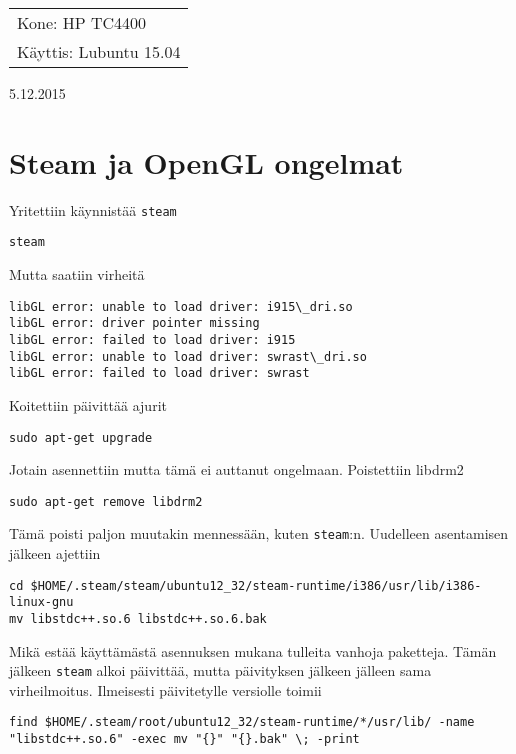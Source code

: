 \documentclass[main.tex]{subfiles}
\begin{document}
\thispagestyle{empty}
\begin{tabular}[t]{l}
Kone: HP TC4400\\
Käyttis: Lubuntu 15.04
\end{tabular}
\hfill 5.12.2015

{\section{Steam ja OpenGL ongelmat}}

Yritettiin käynnistää \texttt{steam}

\begin{lstlisting}
steam
\end{lstlisting}

Mutta saatiin virheitä

\begin{lstlisting}
libGL error: unable to load driver: i915\_dri.so
libGL error: driver pointer missing
libGL error: failed to load driver: i915
libGL error: unable to load driver: swrast\_dri.so
libGL error: failed to load driver: swrast
\end{lstlisting}

Koitettiin päivittää ajurit

\begin{lstlisting}
sudo apt-get upgrade
\end{lstlisting}

Jotain asennettiin mutta tämä ei auttanut ongelmaan. Poistettiin libdrm2

\begin{lstlisting}
sudo apt-get remove libdrm2
\end{lstlisting}

Tämä poisti paljon muutakin mennessään, kuten \texttt{steam}:n. Uudelleen asentamisen jälkeen ajettiin

\begin{lstlisting}
cd $HOME/.steam/steam/ubuntu12_32/steam-runtime/i386/usr/lib/i386-linux-gnu
mv libstdc++.so.6 libstdc++.so.6.bak
\end{lstlisting}

Mikä estää käyttämästä asennuksen mukana tulleita vanhoja paketteja. Tämän jälkeen \texttt{steam} alkoi päivittää, mutta päivityksen jälkeen jälleen sama virheilmoitus. Ilmeisesti päivitetylle versiolle toimii

\begin{lstlisting}
find $HOME/.steam/root/ubuntu12_32/steam-runtime/*/usr/lib/ -name "libstdc++.so.6" -exec mv "{}" "{}.bak" \; -print
\end{lstlisting}
\end{document}
